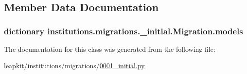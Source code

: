 \subsection{Member Data Documentation}
\hypertarget{classinstitutions_1_1migrations_1_10001__initial_1_1_migration_ad0eddd5ffc4bd46c4472086da97ae229}{
\subsubsection[{models}]{\setlength{\rightskip}{0pt plus 5cm}dictionary institutions.\-migrations.\-\_\-initial.\-Migration.\-models\hspace{0.3cm}{\ttfamily [static]}}}\label{classinstitutions_1_1migrations_1_10001__initial_1_1_migration_ad0eddd5ffc4bd46c4472086da97ae229}


The documentation for this class was generated from the following file\-:\begin{DoxyCompactItemize}
\item 
leapkit/institutions/migrations/\hyperlink{institutions_2migrations_20001__initial_8py}{0001\-\_\-initial.\-py}\end{DoxyCompactItemize}
